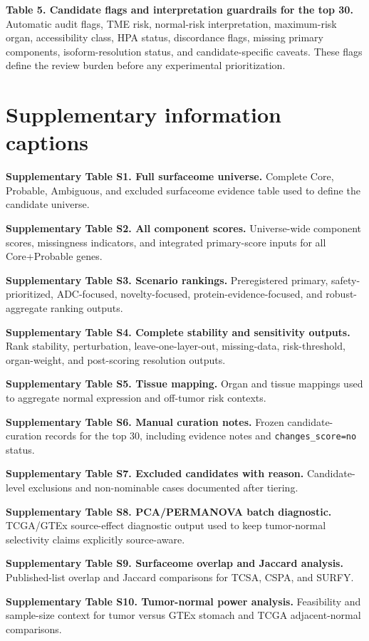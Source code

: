 \documentclass[twocolumn]{article}
\begin{document}
\textbf{Table 5. Candidate flags and interpretation guardrails for the top 30.} Automatic audit flags, TME risk, normal-risk interpretation, maximum-risk organ, accessibility class, HPA status, discordance flags, missing primary components, isoform-resolution status, and candidate-specific caveats. These flags define the review burden before any experimental prioritization.

\section*{Supplementary information captions}

\textbf{Supplementary Table S1. Full surfaceome universe.} Complete Core, Probable, Ambiguous, and excluded surfaceome evidence table used to define the candidate universe.

\textbf{Supplementary Table S2. All component scores.} Universe-wide component scores, missingness indicators, and integrated primary-score inputs for all Core+\allowbreak{}Probable genes.

\textbf{Supplementary Table S3. Scenario rankings.} Preregistered primary, safety-prioritized, ADC-focused, novelty-focused, protein-evidence-focused, and robust-aggregate ranking outputs.

\textbf{Supplementary Table S4. Complete stability and sensitivity outputs.} Rank stability, perturbation, leave-one-layer-out, missing-data, risk-threshold, organ-weight, and post-scoring resolution outputs.

\textbf{Supplementary Table S5. Tissue mapping.} Organ and tissue mappings used to aggregate normal expression and off-tumor risk contexts.

\textbf{Supplementary Table S6. Manual curation notes.} Frozen candidate-curation records for the top 30, including evidence notes and \texttt{changes\_score=no} status.

\textbf{Supplementary Table S7. Excluded candidates with reason.} Candidate-level exclusions and non-nominable cases documented after tiering.

\textbf{Supplementary Table S8. PCA/\allowbreak{}PERMANOVA batch diagnostic.} TCGA/\allowbreak{}GTEx source-effect diagnostic output used to keep tumor-normal selectivity claims explicitly source-aware.

\textbf{Supplementary Table S9. Surfaceome overlap and Jaccard analysis.} Published-list overlap and Jaccard comparisons for TCSA, CSPA, and SURFY.

\textbf{Supplementary Table S10. Tumor-normal power analysis.} Feasibility and sample-size context for tumor versus GTEx stomach and TCGA adjacent-normal comparisons.
\end{document}
